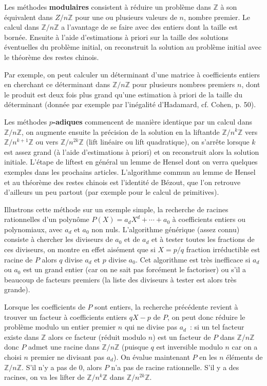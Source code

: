 \documentclass[a4paper,11pt]{article}
\newcommand{\Z}{{\mathbb{Z}}}
\begin{document}
Les m\'ethodes {\bf modulaires} consistent \`a r\'eduire un probl\`eme dans 
$\Z$ \`a son \'equivalent dans $Z/n\Z$ pour une ou 
plusieurs valeurs de $n$, nombre premier. Le calcul dans $\Z/n\Z$
a l'avantage de se faire avec des entiers dont la taille est bornée.
Ensuite \`a l'aide d'estimations 
\`a priori sur la taille des solutions 
\'eventuelles du probl\`eme initial, on reconstruit la solution au problème
initial avec le th\'eor\`eme des restes chinois. 

Par exemple, on peut calculer un d\'eterminant d'une matrice
\`a coefficients entiers en cherchant ce d\'eterminant dans $\Z/n\Z$
pour plusieurs nombres premiers $n$, dont le produit est deux fois plus grand qu'une 
estimation \`a priori de la taille du d\'eterminant 
(donnée par exemple par l'inégalité d'Hadamard, cf. Cohen, p. 50). 

Les m\'ethodes {\bf $p$-adiques} commencent de mani\`ere identique par un 
calcul dans $\Z/n\Z$, on augmente ensuite la
pr\'ecision de la solution en la \og liftant\fg de $\Z/n^k \Z$ vers 
$\Z/n^{k+1}\Z$ ou vers $\Z/n^{2k}\Z$ (lift
lin\'eaire ou lift quadratique), on s'arr\^ete lorsque $k$ est assez grand 
(\`a l'aide d'estimations \`a priori) et on
reconstruit alors la solution initiale. L'\'etape de \og lift\fg est en 
g\'en\'eral un lemme de Hensel dont on verra quelques exemples dans les
prochains articles. L'algorithme
commun au lemme de Hensel et au th\'eor\`eme des restes chinois est 
l'identit\'e de B\'ezout, que l'on retrouve 
d'ailleurs un peu partout (par exemple pour le calcul de primitives). 

Illustrons cette méthode sur un exemple simple, la recherche de 
racines rationnelles d'un polyn\^ome $P(X)=a_d X^d + \cdots + a_0$ 
\`a coefficients entiers ou polynomiaux, avec $a_d$ et $a_0$ non nuls. 
L'algorithme g\'en\'erique (assez connu) consiste 
\`a chercher les diviseurs de $a_0$ et de $a_d$ et \`a tester toutes 
les fractions de ces diviseurs, on montre en effet 
ais\'ement que si $X=p/q$ fraction irr\'eductible est racine de $P$ 
alors $q$ divise $a_d$ et $p$ divise $a_0$. Cet 
algorithme est tr\`es inefficace si $a_d$ ou $a_0$ est un grand entier 
(car on ne sait pas forc\'ement le factoriser) ou 
s'il a beaucoup de facteurs premiers (la liste des diviseurs \`a tester 
est alors tr\`es grande). 

Lorsque les coefficients de $P$ sont entiers, la recherche pr\'ec\'edente 
revient \`a trouver un facteur \`a
coefficients entiers $qX-p$ de $P$, on peut donc r\'eduire le probl\`eme 
modulo un entier premier $n$ qui ne divise pas $a_d$~: si un tel facteur 
existe dans $\Z$ alors ce facteur (r\'eduit modulo $n$) est un facteur 
de $P$ dans $\Z/n\Z$
donc $P$ admet une racine dans $\Z/n\Z$ (puisque $q$ est inversible 
modulo $n$ car on a choisi $n$ premier ne divisant pas $a_d$). On
\'evalue maintenant $P$ en les $n$ \'el\'ements de $\Z/n\Z$. S'il n'y a pas 
de 0, alors $P$ n'a pas de racine rationnelle. S'il y a des racines, on va 
les lifter de $\Z/n^k\Z$ dans $\Z/n^{2k}\Z$.
\end{document}
